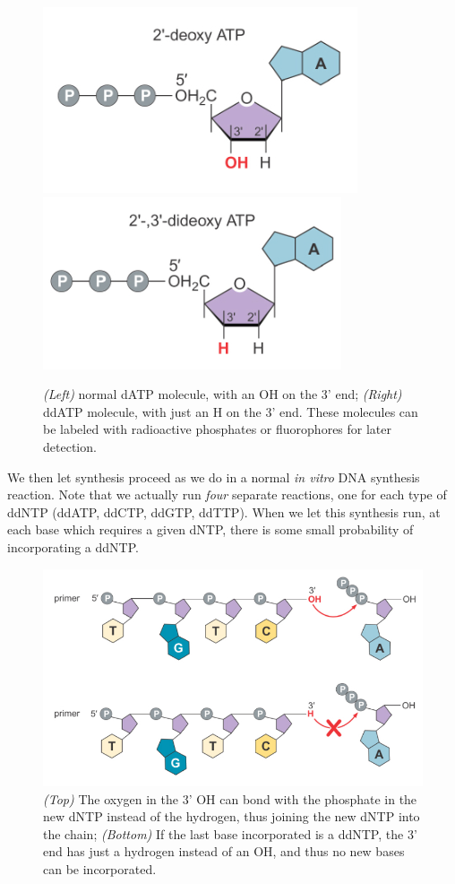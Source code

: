 \documentclass{article}
\begin{document}
\begin{figure}[h!]
    \centering
    \includegraphics[scale=0.5]{images/dntp.png}
    \includegraphics[scale=0.5]{images/ddntp.png}
    \caption{
        \emph{(Left)} normal dATP molecule, with an OH on the 3' end;
        \emph{(Right)} ddATP molecule, with just an H on the 3' end. These molecules can be labeled
        with radioactive phosphates or fluorophores for later detection.
    }
\end{figure}

We then let synthesis proceed as we do in a normal \emph{in vitro} DNA synthesis reaction. Note that
we actually run \emph{four} separate reactions, one for each type of ddNTP (ddATP, ddCTP, ddGTP,
ddTTP). When we let this synthesis run, at each base which requires a given dNTP, there is some
small probability of incorporating a ddNTP.\@

\begin{figure}[h!]
    \centering
    \includegraphics[scale=0.5]{images/synthesis.png}
    \caption{
        \emph{(Top)} The oxygen in the 3' OH can bond with the phosphate in the new dNTP instead of the hydrogen, thus joining
        the new dNTP into the chain;
        \emph{(Bottom)} If the last base incorporated is a ddNTP, the 3' end has just a hydrogen
        instead of an OH, and thus no new bases can be incorporated.
    }
\end{figure}
\end{document}
